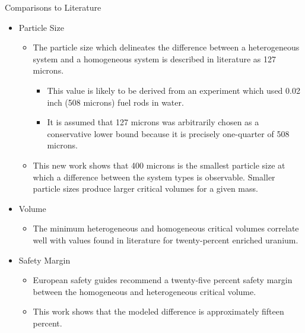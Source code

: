 \documentclass[10pt,aspectratio=169]{beamer}              %
\begin{document}
\begin{frame}{Comparisons to Literature}
    \begin{itemize}
        \item Particle Size
            \begin{itemize}
                \item The particle size which delineates the difference between a heterogeneous system and a homogeneous system is described in literature as 127 microns.
                \begin{itemize}
                    \item This value is likely to be derived from an experiment which used 0.02 inch (508 microns) fuel rods in water.
                    \item It is assumed that 127 microns was arbitrarily chosen as a conservative lower bound because it is precisely one-quarter of 508 microns.
                \end{itemize}
                \item This new work shows that 400 microns is the smallest particle size at which a difference between the system types is observable. Smaller particle sizes produce larger critical volumes for a given mass.
        \end{itemize}
        \item Volume
            \begin{itemize}
                \item The minimum heterogeneous and homogeneous critical volumes correlate well with values found in literature for twenty-percent enriched uranium.
            \end{itemize}
        \item Safety Margin
            \begin{itemize}
                \item European safety guides recommend a twenty-five percent safety margin between the homogeneous and heterogeneous critical volume.
                \item This work shows that the modeled difference is approximately fifteen percent.
            \end{itemize}
    \end{itemize}
\end{frame}
\end{document}
